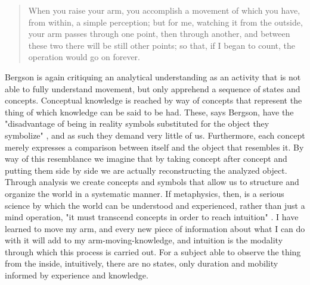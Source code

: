 \documentclass[11pt]{article}
\begin{document}
\begin{quote}
When you raise your arm, you accomplish a movement of which you have, from within, a simple perception; but for me, watching it from the outside, your arm passes through one point, then through another, and between these two there will be still other points; so that, if I began to count, the operation would go on forever. \citep[p. 6]{Bergson1912}
\end{quote}

Bergson is again critiquing an analytical understanding as an activity that is not able to fully understand movement, but only apprehend a sequence of states and concepts. Conceptual knowledge is reached by way of concepts that represent the thing of which knowledge can be said to be had. These, says Bergson, have the "disadvantage of being in reality symbols substituted for the object they symbolize" \citep[p. 17]{Bergson1912}, and as such they demand very little of us. Furthermore, each concept merely expresses a comparison between itself and the object that resembles it. By way of this resemblance we imagine that by taking concept after concept and putting them side by side we are actually reconstructing the analyzed object. Through analysis we create concepts and symbols that allow us to structure and organize the world in a systematic manner. If metaphysics, then, is a serious science by which the world can be understood and experienced, rather than just a mind operation, "it must transcend concepts in order to reach intuition" \citep[p.21]{Bergson1912}. I have learned to move my arm, and every new piece of information about what I can do with it will add to my arm-moving-knowledge, and intuition is the modality through which this process is carried out. For a subject able to observe the thing from the inside, intuitively, there are no states, only duration and mobility informed by experience and knowledge.  
\end{document}
